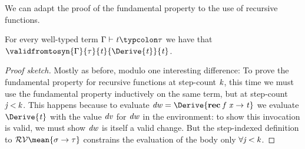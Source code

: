 We can adapt the proof of the fundamental property to the use of recursive functions.
\begin{theorem}
  \label{thm:fund-lemma-derive-correct-types-si-intensional-rec}
  For every well-typed term \ensuremath{\Gamma\vdash\Varid{t}\typcolon\tau} we have that
  \ensuremath{\validfromtosyn{\Gamma}{\tau}{\Varid{t}}{\Derive{\Varid{t}}}{\Varid{t}}}.
\end{theorem}
\begin{proof}[Proof sketch]
  Mostly as before, modulo one interesting difference:
  To prove the fundamental property for recursive
  functions at step-count \ensuremath{\Varid{k}}, this time we must use the
  fundamental property inductively on the same term, but at
  step-count \ensuremath{\Varid{j}\mathbin{<}\Varid{k}}.
  This happens because to evaluate \ensuremath{\Varid{dw}\mathrel{=}\Derive{\mathbf{rec}\;\Varid{f}\;\Varid{x}\to \Varid{t}}} we
  evaluate \ensuremath{\Derive{\Varid{t}}} with the value \ensuremath{\Varid{dv}} for \ensuremath{\Varid{dw}} in the
  environment: to show this invocation is valid, we must show \ensuremath{\Varid{dw}}
  is itself a valid change. But the step-indexed
  definition to \ensuremath{\mathcal{RV}\mean{\sigma\to \tau}} constrains the evaluation
  of the body only \ensuremath{\forall \Varid{j}\hsforall \mathbin{<}\Varid{k}}.



\end{proof}

